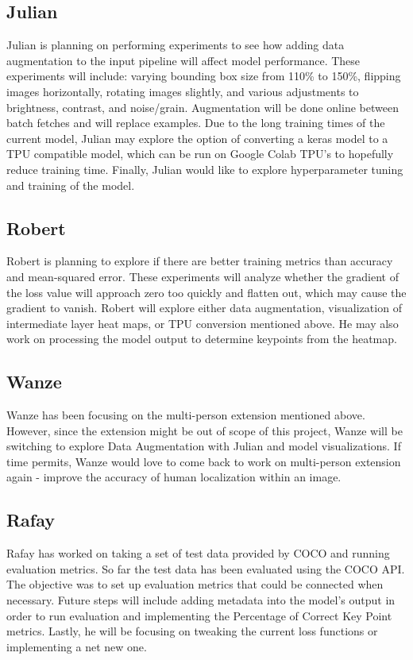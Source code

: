 \documentclass[11pt, letterpaper]{article}
\begin{document}
\subsection{Julian}
Julian is planning on performing experiments to see how adding data augmentation to the input pipeline will affect model performance. These experiments will include: varying bounding box size from 110\% to 150\%, flipping images horizontally, rotating images slightly, and various adjustments to brightness, contrast, and noise/grain. Augmentation will be done online between batch fetches and will replace examples. Due to the long training times of the current model, Julian may explore the option of converting a keras model to a TPU compatible model, which can be run on Google Colab TPU’s to hopefully reduce training time. Finally, Julian would like to explore hyperparameter tuning and training of the model.

\subsection{Robert}
Robert is planning to explore if there are better training metrics than accuracy and mean-squared error. These experiments will analyze whether the gradient of the loss value will approach zero too quickly and flatten out, which may cause the gradient to vanish. Robert will explore either data augmentation, visualization of intermediate layer heat maps, or TPU conversion mentioned above. He may also work on processing the model output to determine keypoints from the heatmap. 
\subsection{Wanze}
Wanze has been focusing on the multi-person extension mentioned above. However, since the extension might be out of scope of this project, Wanze will be switching to explore Data Augmentation with Julian and model visualizations. If time permits, Wanze would love to come back to work on  multi-person extension again - improve the accuracy of human localization within an image. 
\subsection{Rafay}
Rafay has worked on taking a set of test data provided by COCO and running evaluation metrics. So far the test data has been evaluated using the COCO API. The objective was to set up evaluation metrics that could be connected when necessary. Future steps will include adding metadata into the model’s output in order to run evaluation and implementing the Percentage of Correct Key Point metrics. Lastly, he will be focusing on tweaking the current loss functions or implementing a net new one.   
\end{document}

